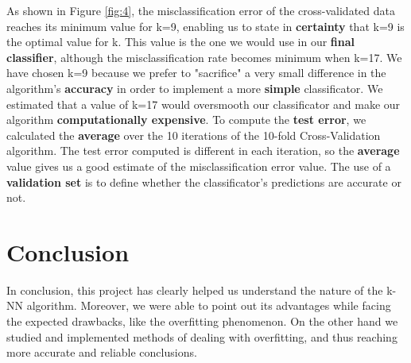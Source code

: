 \documentclass[letterpaper,11pt]{article}
\begin{document}
As shown in Figure \ref{fig:4}, the misclassification error of the cross-validated data reaches its minimum value for k=9, enabling us to state in \textbf{certainty} that k=9 is the optimal value for k.
This value is the one we would use in our \textbf{final classifier}, although the misclassification rate becomes minimum when k=17. We have chosen k=9 because we prefer to "sacrifice" a very small difference in the algorithm's \textbf{accuracy} in order to implement a more \textbf{simple} classificator. We estimated that a value of k=17 would oversmooth our classificator and make our algorithm \textbf{computationally expensive}.
To compute the \textbf{test error}, we calculated the \textbf{average} over the 10 iterations of the 10-fold Cross-Validation algorithm. The test error computed is different in each iteration, so the \textbf{average} value gives us a good estimate of the misclassification error value.
The use of a \textbf{validation set} is to define whether the classificator's predictions are accurate or not.


 


 \section*{Conclusion}
In conclusion, this project has clearly helped us understand the nature of the k-NN algorithm. Moreover, we were able to point out its advantages while facing the expected drawbacks, like the overfitting phenomenon. On the other hand we studied and implemented methods of dealing with overfitting, and thus reaching more accurate and reliable conclusions.


    
\end{document}
